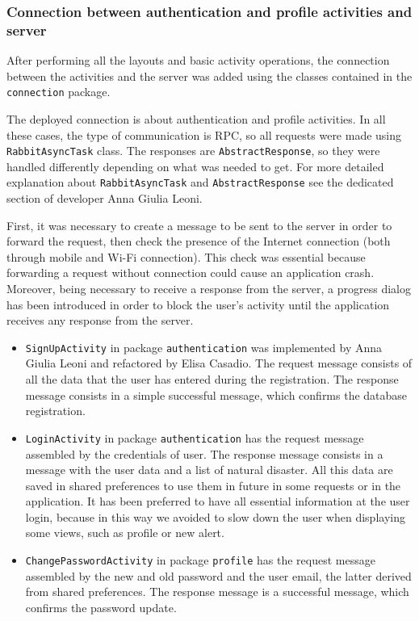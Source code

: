 \documentclass[a4paper,12pt]{report}
\begin{document}
\subsubsection{Connection between authentication and profile activities and server}
After performing all the layouts and basic activity operations, the connection between the activities and the server was added using the classes contained in the \texttt{connection} package.

The deployed connection is about authentication and profile activities. In all these cases, the type of communication is RPC, so all requests were made using \texttt{RabbitAsyncTask} class. The responses are \texttt{AbstractResponse}, so they were handled differently depending on what was needed to get. For more detailed explanation about \texttt{RabbitAsyncTask} and \texttt{AbstractResponse} see the dedicated section of developer Anna Giulia Leoni.

First, it was necessary to create a message to be sent to the server in order to forward the request, then check the presence of the Internet connection (both through mobile and Wi-Fi connection). This check was essential because forwarding a request without connection could cause an application crash. Moreover, being necessary to receive a response from the server, a progress dialog has been introduced in order to block the user's activity until the application receives any response from the server.

\begin{itemize}
\item \texttt{SignUpActivity} in package \texttt{authentication} was implemented by Anna Giulia Leoni and refactored by Elisa Casadio. The request message consists of all the data that the user has entered during the registration. The response message consists in a simple successful message, which confirms the database registration.
\item \texttt{LoginActivity} in package \texttt{authentication} has the request message assembled by the credentials of user. The response message consists in a message with the user data and a list of natural disaster. All this data are saved in shared preferences to use them in future in some requests or in the application. It has been preferred to have all essential information at the user login, because in this way we avoided to slow down the user when displaying some views, such as profile or new alert.
\item \texttt{ChangePasswordActivity} in package \texttt{profile} has the request message assembled by the new and old password and the user email, the latter derived from shared preferences. The response message is a successful message, which confirms the password update.
\end{itemize}
\end{document}
